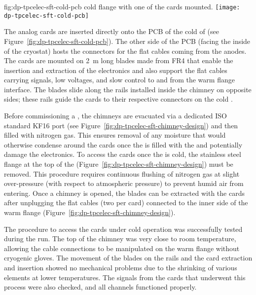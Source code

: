 \begin{dunefigure}{fig:dp-tpcelec-sft-cold-pcb}
{ cold \fdth flange with one of the  cards mounted.}
\texttt{[image: dp-tpcelec-sft-cold-pcb]}
\end{dunefigure}

The analog  cards are inserted directly onto the PCB of the cold \fdth of  (see Figure~\ref{fig:dp-tpcelec-sft-cold-pcb}). The other side of the PCB (facing the inside of the cryostat) hosts the connectors for the flat cables coming from the  anodes.  The  cards are mounted on \SI{2}{\m} long blades made from FR4 that enable the insertion and extraction of the electronics and also support the flat cables carrying signals, low voltages, and slow control to and from the warm flange interface.  The blades slide along the rails installed inside the chimney on opposite sides; these rails guide the  cards to their respective connectors on the cold \fdth. 

Before commissioning a , the chimneys are evacuated via a dedicated ISO standard KF16 port (see Figure~\ref{fig:dp-tpcelec-sft-chimney-design}) and then filled with nitrogen gas. This ensures removal of any moisture that would otherwise condense around the  cards once the  is filled with the \lar and %
potentially damage the electronics. To access the  cards once the  is cold, the stainless steel flange at the top of the  (Figure~\ref{fig:dp-tpcelec-sft-chimney-design}) must be removed. This procedure requires continuous flushing of nitrogen gas at slight over-pressure (with respect to atmospheric pressure) to prevent humid air from  entering. Once a chimney is opened, the blades can be extracted with the  cards after unplugging the flat cables (two per card) connected to the inner side of the warm flange (Figure~\ref{fig:dp-tpcelec-sft-chimney-design}).

The procedure to access the  cards under cold operation was successfully tested  %
during the   run. The top of the chimney was very close to room temperature, allowing the cable connections to be manipulated on the warm \fdth flange without cryogenic gloves. The movement of the blades on the rails and the  card extraction and insertion %
showed no mechanical problems due to the shrinking of various elements at lower temperatures.  The signals from the  cards that underwent this process were also checked, and all channels functioned properly.


